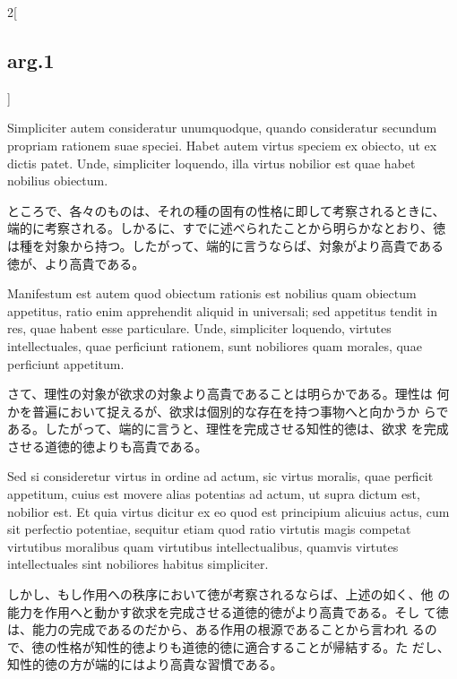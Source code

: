 \documentclass[paper=a4paper,fontsize=10pt,jafontsize=9pt,titlepage]{jlreq}
\begin{document}
\begin{paracol}{2}[\subsection{arg.1}]
\switchcolumn*

Simpliciter autem consideratur unumquodque, quando consideratur
secundum propriam rationem suae speciei. Habet autem virtus speciem ex
obiecto, ut ex dictis patet. Unde, simpliciter loquendo, illa virtus
nobilior est quae habet nobilius obiectum.

\switchcolumn

ところで、各々のものは、それの種の固有の性格に即して考察されるときに、
端的に考察される。しかるに、すでに述べられたことから明らかなとおり、徳
は種を対象から持つ。したがって、端的に言うならば、対象がより高貴である
徳が、より高貴である。

\switchcolumn*

Manifestum est autem quod obiectum rationis est nobilius quam
obiectum appetitus, ratio enim apprehendit aliquid in universali; sed
appetitus tendit in res, quae habent esse particulare. Unde,
simpliciter loquendo, virtutes intellectuales, quae perficiunt
rationem, sunt nobiliores quam morales, quae perficiunt appetitum.

\switchcolumn

さて、理性の対象が欲求の対象より高貴であることは明らかである。理性は
 何かを普遍において捉えるが、欲求は個別的な存在を持つ事物へと向かうか
 らである。したがって、端的に言うと、理性を完成させる知性的徳は、欲求
 を完成させる道徳的徳よりも高貴である。

\switchcolumn*

Sed si consideretur virtus in ordine ad actum, sic virtus moralis,
quae perficit appetitum, cuius est movere alias potentias ad actum, ut
supra dictum est, nobilior est. Et quia virtus dicitur ex eo quod est
principium alicuius actus, cum sit perfectio potentiae, sequitur etiam
quod ratio virtutis magis competat virtutibus moralibus quam
virtutibus intellectualibus, quamvis virtutes intellectuales sint
nobiliores habitus simpliciter.

\switchcolumn

しかし、もし作用への秩序において徳が考察されるならば、上述の如く、他
 の能力を作用へと動かす欲求を完成させる道徳的徳がより高貴である。そし
 て徳は、能力の完成であるのだから、ある作用の根源であることから言われ
 るので、徳の性格が知性的徳よりも道徳的徳に適合することが帰結する。た
 だし、知性的徳の方が端的にはより高貴な習慣である。

\switchcolumn*[\subsection{ad.1}]


\end{paracol}
\end{document}
